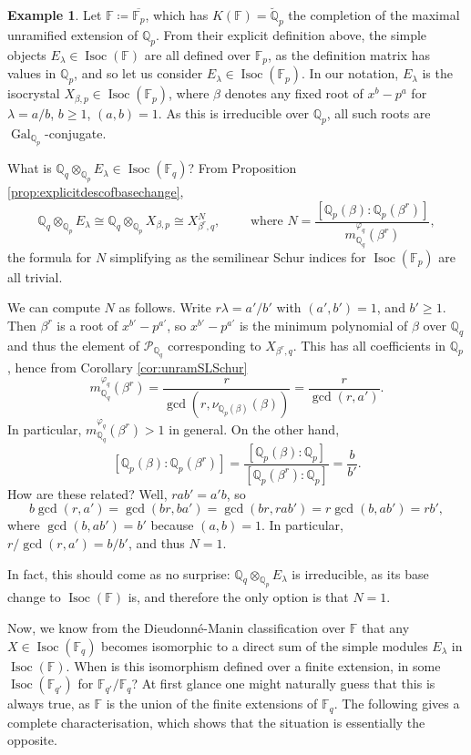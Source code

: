 \documentclass[10pt, reqno, hidelinks]{amsart}
\DeclareMathOperator{\Isoc}{Isoc}
\DeclareMathOperator{\Gal}{Gal}
\newcommand{\bF}{{\mathbb F}}
\newcommand{\bQ}{{\mathbb Q}}
\newcommand{\sP}{{\mathcal P}}
\numberwithin{thm}{subsection}
\theoremstyle{definition}
\newtheorem{eg}[thm]{Example}
\begin{document}
\begin{eg}\label{eg:basechangeofsimplesfromFp}
Let $\bF \coloneqq \overline{\bF_p}$, which has $K(\bF) = \breve{\bQ}_p$ the completion of the maximal unramified extension of $\bQ_p$. From their explicit definition above, the simple objects $E_{\lambda} \in \Isoc(\bF)$ are all defined over $\bF_p$, as the definition matrix has values in $\bQ_p$, and so let us consider $E_{\lambda} \in \Isoc(\bF_p)$. In our notation, $E_{\lambda}$ is the isocrystal $X_{\beta, p} \in \Isoc(\bF_p)$, where $\beta$ denotes any fixed root of $x^b - p^a$ for $\lambda = a/b$, $b \geq 1$, $(a,b) = 1$. As this is irreducible over $\bQ_p$, all such roots are $\Gal_{\bQ_p}$-conjugate.

What is $\bQ_q \otimes_{\bQ_p} E_{\lambda} \in \Isoc(\bF_q)$? From Proposition \ref{prop:explicitdescofbasechange},
\[
\bQ_q \otimes_{\bQ_p} E_{\lambda} \cong \bQ_q \otimes_{\bQ_p} X_{\beta, p} \cong X_{\beta^r, q}^{N}, \qquad \text{ where } N = \frac{[\bQ_p(\beta) : \bQ_p(\beta^r)]}{m_{\bQ_q}^{\varphi_q}(\beta^r)},
\]
the formula for $N$ simplifying as the semilinear Schur indices for $\Isoc(\bF_p)$ are all trivial.

We can compute $N$ as follows. Write $r \lambda = a' / b'$ with $(a',b') = 1$, and $b' \geq 1$. Then $\beta^r$ is a root of $x^{b'} - p^{a'}$, so $x^{b'} - p^{a'}$ is the minimum polynomial of $\beta$ over $\bQ_q$ and thus the element of $\sP_{\bQ_q}$ corresponding to $X_{\beta^r, q}$. This has all coefficients in $\bQ_p$, hence from Corollary \ref{cor:unramSLSchur}
\[
m_{\bQ_q}^{\varphi_q}(\beta^r) = \frac{r}{\gcd(r, \nu_{\bQ_p(\beta)}(\beta))}
= \frac{r}{\gcd(r, a')}. 
\]
In particular, $m_{\bQ_q}^{\varphi_q}(\beta^r) > 1$ in general. On the other hand,
\[
[\bQ_p(\beta) : \bQ_p(\beta^r)] = \frac{[\bQ_p(\beta) : \bQ_p]}{[\bQ_p(\beta^r) : \bQ_p]} = \frac{b}{b'}.
\]
How are these related? Well, $r a b' = a' b$, so
\[
b \gcd(r, a') = \gcd(br, ba') = \gcd(br, rab') = r \gcd(b,ab') = r b',
\]
where $\gcd(b,ab') = b'$ because $(a,b) = 1$. In particular, $r / \gcd(r,a') = b / b'$, and thus $N = 1$.

In fact, this should come as no surprise: $\bQ_q \otimes_{\bQ_p} E_{\lambda}$ is irreducible, as its base change to $\Isoc(\bF)$ is, and therefore the only option is that $N = 1$.
\end{eg}

Now, we know from the Dieudonn\'{e}-Manin classification over $\bF$ that any $X \in \Isoc(\bF_q)$ becomes isomorphic to a direct sum of the simple modules $E_{\lambda}$ in $\Isoc(\bF)$. When is this isomorphism defined over a finite extension, in some $\Isoc(\bF_{q'})$ for $\bF_{q'} / \bF_q$? At first glance one might naturally guess that this is always true, as $\bF$ is the union of the finite extensions of $\bF_q$. The following gives a complete characterisation, which shows that the situation is essentially the opposite.
\end{document}

